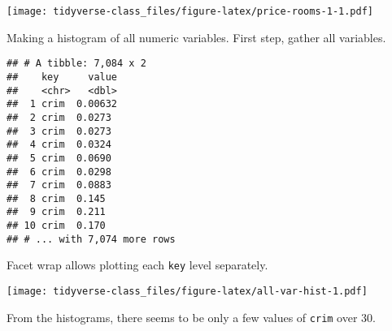 \documentclass[]{book}
\newenvironment{Shaded}{\begin{snugshade}}{\end{snugshade}}
\newcommand{\KeywordTok}[1]{\textcolor[rgb]{0.13,0.29,0.53}{\textbf{#1}}}
\newcommand{\DataTypeTok}[1]{\textcolor[rgb]{0.13,0.29,0.53}{#1}}
\newcommand{\DecValTok}[1]{\textcolor[rgb]{0.00,0.00,0.81}{#1}}
\newcommand{\StringTok}[1]{\textcolor[rgb]{0.31,0.60,0.02}{#1}}
\newcommand{\CommentTok}[1]{\textcolor[rgb]{0.56,0.35,0.01}{\textit{#1}}}
\newcommand{\OperatorTok}[1]{\textcolor[rgb]{0.81,0.36,0.00}{\textbf{#1}}}
\newcommand{\NormalTok}[1]{#1}
\begin{document}
\texttt{[image: tidyverse-class\_files/figure-latex/price-rooms-1-1.pdf]}

Making a histogram of all numeric variables. First step, gather all
variables.

\begin{Shaded}
\end{Shaded}

\begin{verbatim}
## # A tibble: 7,084 x 2
##    key     value
##    <chr>   <dbl>
##  1 crim  0.00632
##  2 crim  0.0273 
##  3 crim  0.0273 
##  4 crim  0.0324 
##  5 crim  0.0690 
##  6 crim  0.0298 
##  7 crim  0.0883 
##  8 crim  0.145  
##  9 crim  0.211  
## 10 crim  0.170  
## # ... with 7,074 more rows
\end{verbatim}

Facet wrap allows plotting each \texttt{key} level separately.

\begin{Shaded}
\end{Shaded}

\texttt{[image: tidyverse-class\_files/figure-latex/all-var-hist-1.pdf]}

From the histograms, there seems to be only a few values of
\texttt{crim} over 30.

\begin{Shaded}
\end{Shaded}
\end{document}
